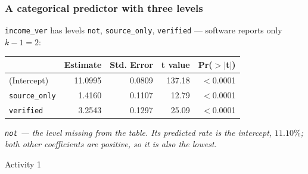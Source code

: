 \documentclass[slidestop,compress,mathserif]{beamer}
\newcommand{\soln}[1]{\textit{#1}}
\begin{document}
\begin{frame}
\frametitle{A categorical predictor with three levels}

\texttt{income\_ver} has levels \texttt{not}, \texttt{source\_only}, \texttt{verified} --- software reports only $k-1=2$:

{\scriptsize
\begin{center}
\begin{tabular}{l rrr r}
\toprule
 & Estimate & Std. Error & t value & Pr($>$$|$t$|$) \\
\midrule
(Intercept) & 11.0995 & 0.0809 & 137.18 & $<$0.0001 \\
\texttt{source\_only} & 1.4160 & 0.1107 & 12.79 & $<$0.0001 \\
\texttt{verified} & 3.2543 & 0.1297 & 25.09 & $<$0.0001 \\
\bottomrule
\end{tabular}
\end{center}}


\pause
\soln{\texttt{not} --- the level \emph{missing} from the table. Its predicted rate is the intercept, $11.10\%$; both other coefficients are positive, so it is also the lowest.}

\end{frame}
\begin{frame}{Activity 1}
\end{frame}
\end{document}
